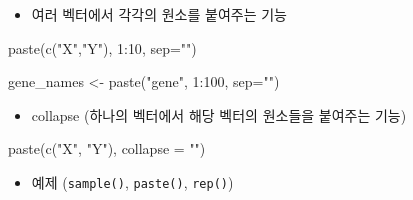 \documentclass[
]{book}
\newenvironment{Shaded}{\begin{snugshade}}{\end{snugshade}}
\newcommand{\AttributeTok}[1]{\textcolor[rgb]{0.77,0.63,0.00}{#1}}
\newcommand{\DecValTok}[1]{\textcolor[rgb]{0.00,0.00,0.81}{#1}}
\newcommand{\FunctionTok}[1]{\textcolor[rgb]{0.00,0.00,0.00}{#1}}
\newcommand{\NormalTok}[1]{#1}
\newcommand{\OtherTok}[1]{\textcolor[rgb]{0.56,0.35,0.01}{#1}}
\newcommand{\SpecialCharTok}[1]{\textcolor[rgb]{0.00,0.00,0.00}{#1}}
\newcommand{\StringTok}[1]{\textcolor[rgb]{0.31,0.60,0.02}{#1}}
\providecommand{\tightlist}{%
  \setlength{\itemsep}{0pt}\setlength{\parskip}{0pt}}
\begin{document}
\begin{itemize}
\tightlist
\item
  여러 벡터에서 각각의 원소를 붙여주는 기능
\end{itemize}

\begin{Shaded}
\begin{Highlighting}[]
\FunctionTok{paste}\NormalTok{(}\FunctionTok{c}\NormalTok{(}\StringTok{"X"}\NormalTok{,}\StringTok{"Y"}\NormalTok{), }\DecValTok{1}\SpecialCharTok{:}\DecValTok{10}\NormalTok{, }\AttributeTok{sep=}\StringTok{""}\NormalTok{)}

\NormalTok{gene\_names }\OtherTok{\textless{}{-}} \FunctionTok{paste}\NormalTok{(}\StringTok{"gene"}\NormalTok{, }\DecValTok{1}\SpecialCharTok{:}\DecValTok{100}\NormalTok{, }\AttributeTok{sep=}\StringTok{""}\NormalTok{)}
\end{Highlighting}
\end{Shaded}

\begin{itemize}
\tightlist
\item
  collapse (하나의 벡터에서 해당 벡터의 원소들을 붙여주는 기능)
\end{itemize}

\begin{Shaded}
\begin{Highlighting}[]
\FunctionTok{paste}\NormalTok{(}\FunctionTok{c}\NormalTok{(}\StringTok{"X"}\NormalTok{, }\StringTok{"Y"}\NormalTok{), }\AttributeTok{collapse =} \StringTok{""}\NormalTok{)}
\end{Highlighting}
\end{Shaded}

\begin{itemize}
\tightlist
\item
  예제 (\texttt{sample()}, \texttt{paste()}, \texttt{rep()})
\end{itemize}
\end{document}
